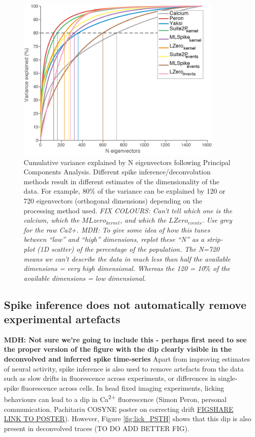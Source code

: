 \documentclass[a4paper,10pt,twocolumn]{article}
\begin{document}
\begin{figure}
\includegraphics[width=0.9\textwidth]{full_figs/why_deconvolve_F7_2.png}
\caption{\label{fig:dimensionality}Cumulative variance explained by N eigenvectors following Principal Components Analysis. Different spike inference/deconvolution methods result in different estimates of the dimensionality of the data. For example, 80$\%$ of the variance can be explained by 120 or 720 eigenvectors (orthogonal dimensions) depending on the processing method used. \emph{FIX COLOURS: Can't tell which one is the calcium, which the $MLzero_{kernel}$, and which the $LZero_{events}$. Use grey for the raw Ca2+. MDH: To give some idea of how this tunes between “low” and “high” dimensions, replot these “N” as a strip-plot (1D scatter) of the percentage of the population. The N=720 means we can’t describe the data in much less than half the available dimensions = very high dimensional. Whereas the 120 = 10$\%$ of the available dimensions = low dimensional.}}
\end{figure}




\subsection*{Spike inference does not automatically remove experimental artefacts}
\textbf{MDH: Not sure we're going to include this - perhaps first need to see the proper version of the figure with the dip clearly visible in the deconvolved and inferred spike time-series}
Apart from improving estimates of neural activity, spike inference is also used to remove artefacts from the data such as slow drifts in fluorescence across experiments, or differences in single-spike fluorescence across cells. In head fixed imaging experiments, licking behaviours can lead to a dip in Ca\textsuperscript{2+} fluorescence (Simon Peron, personal communication. Pachitariu COSYNE poster on correcting drift {\href{https://figshare.com/articles/Drift_correction_for_electrophysiology_and_two-photon_calcium_imaging/5946574}{{\color{blue} FIGSHARE LINK TO POSTER}}}). However, Figure \ref{fig:lick_PSTH} shows that this dip is also present in deconvolved traces (TO DO ADD BETTER FIG).
\end{document}
